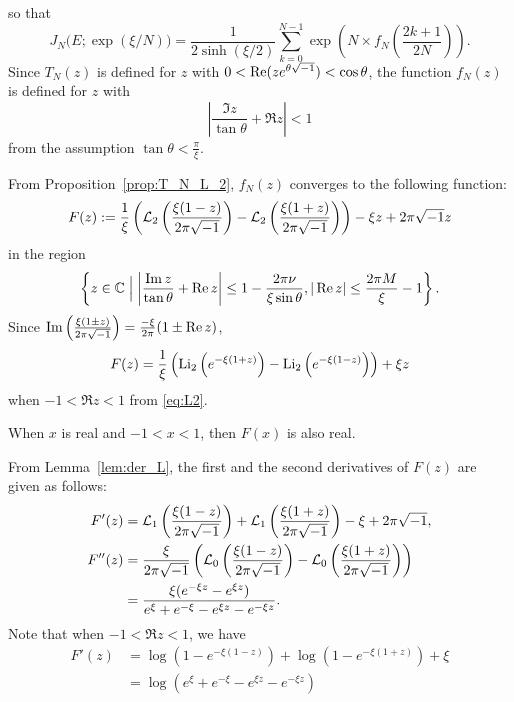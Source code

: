 so that
\begin{equation}\label{eq:Jones_sum}
  J_N\bigl(E;\exp(\xi/N)\bigr)
  =
  \frac{1}{2\sinh(\xi/2)}
  \sum_{k=0}^{N-1}\exp\left(N\times f_{N}\left(\frac{2k+1}{2N}\right)\right).
\end{equation}
Since $T_{N}(z)$ is defined for $z$ with $0<\operatorname{Re}(z e^{\theta\sqrt{-1}})<\cos\theta$, the function $f_{N}(z)$ is defined for $z$ with
\begin{equation*}
  \left|\frac{\Im{z}}{\tan\theta}+\Re{z}\right|<1
\end{equation*}
from the assumption $\tan\theta<\frac{\pi}{\xi}$.
\par
From Proposition~\ref{prop:T_N_L_2}, $f_N(z)$ converges to the following function:
\begin{equation*}
  F(z)
  :=
  \frac{1}{\xi}
  \left(
    \mathcal{L}_2\left(\frac{\xi(1-z)}{2\pi\sqrt{-1}}\right)
    -
    \mathcal{L}_2\left(\frac{\xi(1+z)}{2\pi\sqrt{-1}}\right)
  \right)
  -\xi z+2\pi\sqrt{-1} z
\end{equation*}
in the region
\begin{equation*}
  \left\{
    z\in\mathbb{C}\Bigm|
    \left|\frac{\operatorname{Im}{z}}{\tan\theta}+\operatorname{Re}{z}\right|
    \le
    1-\frac{2\pi\nu}{\xi\sin\theta},
    |\operatorname{Re}{z}|\le\frac{2\pi M}{\xi}-1
  \right\}.
\end{equation*}
Since $\operatorname{Im}\left(\frac{\xi(1\pm z)}{2\pi\sqrt{-1}}\right)=\frac{-\xi}{2\pi}(1\pm\operatorname{Re}{z})$,
\begin{equation*}
  F(z)
  =
  \frac{1}{\xi}
  \left(
    \operatorname{Li}_2\left(e^{-\xi(1+z)}\right)
    -
    \operatorname{Li}_2\left(e^{-\xi(1-z)}\right)
  \right)
  +\xi z
\end{equation*}
when $-1<\Re{z}<1$ from \eqref{eq:L2}.
\begin{rem}\label{rem:F_real}
When $x$ is real and $-1<x<1$, then $F(x)$ is also real.
\end{rem}
From Lemma~\ref{lem:der_L}, the first and the second derivatives of $F(z)$ are given as follows:
\begin{align*}
  F'(z)
  &=
  \mathcal{L}_1\left(\frac{\xi(1-z)}{2\pi\sqrt{-1}}\right)
  +
  \mathcal{L}_1\left(\frac{\xi(1+z)}{2\pi\sqrt{-1}}\right)
  -\xi+2\pi\sqrt{-1},
  \\
  F''(z)
  &=
  \frac{\xi}{2\pi\sqrt{-1}}
  \left(
    \mathcal{L}_0\left(\frac{\xi(1-z)}{2\pi\sqrt{-1}}\right)
    -
    \mathcal{L}_0\left(\frac{\xi(1+z)}{2\pi\sqrt{-1}}\right)
  \right)
  \\
  &=
  \frac{\xi(e^{-\xi z}-e^{\xi z})}{e^{\xi}+e^{-\xi}-e^{\xi z}-e^{-\xi z}}.
\end{align*}
Note that when $-1<\Re{z}<1$, we have
\begin{equation}\label{eq:F'}
\begin{split}
  F'(z)
  &=
  \log(1-e^{-\xi(1-z)})+\log(1-e^{-\xi(1+z)})+\xi
  \\
  &=
  \log(e^{\xi}+e^{-\xi}-e^{\xi z}-e^{-\xi z})
\end{split}
\end{equation}
